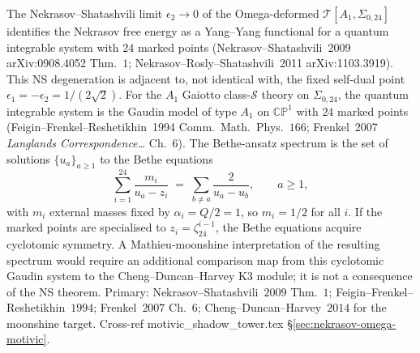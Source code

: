 \begin{remark}
\label{rem:feyn-nekrasov-NS-bethe}
The Nekrasov--Shatashvili limit $\epsilon_2 \to 0$ of the
Omega-deformed $\mathcal T[A_1, \Sigma_{0,24}]$ identifies
the Nekrasov free energy as a Yang--Yang functional for a
quantum integrable system with $24$ marked points
(Nekrasov--Shatashvili~2009 arXiv:0908.4052 Thm.~$1$;
Nekrasov--Rosly--Shatashvili~2011 arXiv:1103.3919). This NS
degeneration is adjacent to, not identical with, the fixed
self-dual point $\epsilon_1=-\epsilon_2=1/(2\sqrt2)$.  For the
$A_1$ Gaiotto class-$\mathcal S$
theory on $\Sigma_{0,24}$, the quantum integrable system is
the Gaudin model of type $A_1$ on $\mathbb{CP}^1$ with $24$
marked points (Feigin--Frenkel--Reshetikhin~1994 Comm.\ Math.\
Phys.~$166$; Frenkel~2007 \emph{Langlands
Correspondence\ldots} Ch.~$6$). The Bethe-ansatz spectrum is
the set of solutions $\{u_a\}_{a\geq 1}$ to the Bethe
equations
\[
 \sum_{i=1}^{24}\frac{m_i}{u_a - z_i}
 \;=\;
 \sum_{b\neq a}\frac{2}{u_a - u_b}, \qquad a\geq 1,
\]
with $m_i$ external masses fixed by $\alpha_i = Q/2 = 1$, so
$m_i = 1/2$ for all $i$.  If the marked points are specialised to
$z_i=\zeta_{24}^{i-1}$, the Bethe equations acquire cyclotomic
symmetry.  A Mathieu-moonshine interpretation of the resulting
spectrum would require an additional comparison map from this
cyclotomic Gaudin system to the Cheng--Duncan--Harvey K3 module; it is
not a consequence of the NS theorem. Primary:
Nekrasov--Shatashvili~$2009$ Thm.~$1$; Feigin--Frenkel--
Reshetikhin~$1994$; Frenkel~$2007$ Ch.~$6$;
Cheng--Duncan--Harvey~$2014$ for the moonshine target. Cross-ref
motivic\_shadow\_tower.tex
\S\ref{sec:nekrasov-omega-motivic}.
\end{remark}

